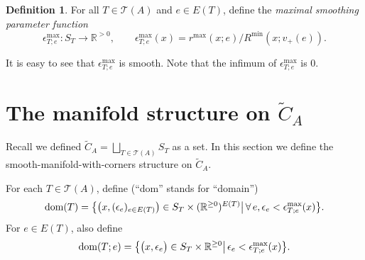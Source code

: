 \documentclass[11pt]{article}
\theoremstyle{definition}
\newtheorem{dfn}[thm]{Definition}
\theoremstyle{remark}
\def\wt#1{\widetilde{#1}}
\def\R{\mathbb{R}}
\def\cT{\mathcal{T}}
\def\dom{{\tn{dom}}}
\def\tn#1{\textnormal{#1}}
\begin{document}
\begin{dfn}
For all $T\in\cT(A)$ and $e\in E(T)$, define the {\it maximal smoothing parameter function}
$$\epsilon^{\max}_{T;e}:S_T\longrightarrow \R^{>0},\qquad \epsilon^{\max}_{T;e}(x)=r^{\max}(x;e)\big/R^{\min}(x;v_+(e)).$$
\end{dfn}
It is easy to see that $\epsilon^{\max}_{T;e}$ is smooth. Note that the infimum of $\epsilon^{\max}_{T;e}$ is 0. 





\section{The manifold structure on \texorpdfstring{$\wt{C}_A$}{the big configuration space}}
\label{conftilde_sec}

Recall we defined $\wt{C}_A=\bigsqcup_{T\in\cT(A)}S_T$ as a set. 
In this section we define the smooth-manifold-with-corners structure on $\wt{C}_A$. 


For each $T\in\cT(A)$, define (``dom'' stands for ``domain'')
$$\dom(T)=\big\{\big(x,(\epsilon_e)_{e\in E(T)}\big)\in S_T\times(\R^{\ge0})^{E(T)}\big|\,\forall\,e, \epsilon_e<\epsilon^{\max}_{T;e}(x)\big\}.$$
For $e\in E(T)$, also define
$$\dom(T;e)=\big\{\big(x,\epsilon_e\big)\in S_T\times\R^{\ge0}\big|\, \epsilon_e<\epsilon^{\max}_{T;e}(x)\big\}.$$
\end{document}
